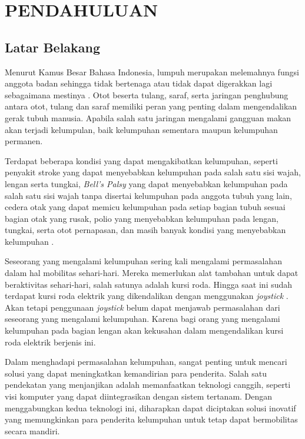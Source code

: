 \chapter{PENDAHULUAN}
\label{chap:pendahuluan}


\section{Latar Belakang}
\label{sec:latarbelakang}

Menurut Kamus Besar Bahasa Indonesia, lumpuh merupakan melemahnya fungsi anggota badan sehingga tidak bertenaga atau tidak dapat digerakkan lagi sebagaimana mestinya \parencite{Daring_2016}. Otot beserta tulang, saraf, serta jaringan penghubung antara otot, tulang dan saraf memiliki peran yang penting dalam mengendalikan gerak tubuh manusia. Apabila salah satu jaringan mengalami gangguan makan akan terjadi kelumpulan, baik kelumpuhan sementara maupun kelumpuhan permanen.

Terdapat beberapa kondisi yang dapat mengakibatkan kelumpuhan, seperti penyakit stroke yang dapat menyebabkan kelumpuhan pada salah satu sisi wajah, lengan serta tungkai, \emph{Bell's Palsy} yang dapat menyebabkan kelumpuhan pada salah satu sisi wajah tanpa disertai kelumpuhan pada anggota tubuh yang lain, cedera otak yang dapat memicu kelumpuhan pada setiap bagian tubuh sesuai bagian otak yang rusak, polio yang menyebabkan kelumpuhan pada lengan, tungkai, serta otot pernapasan, dan masih banyak kondisi yang menyebabkan kelumpuhan \parencite{Pansawira_2022}.

Seseorang yang mengalami kelumpuhan sering kali mengalami permasalahan dalam hal mobilitas sehari-hari. Mereka memerlukan alat tambahan untuk dapat beraktivitas sehari-hari, salah satunya adalah kursi roda. Hingga saat ini sudah terdapat kursi roda elektrik yang dikendalikan dengan menggunakan \emph{joystick} \parencite{choi2019motion}. Akan tetapi penggunaan \emph{joystick} belum dapat menjawab permasalahan dari seseorang yang mengalami kelumpuhan. Karena bagi orang yang mengalami kelumpuhan pada bagian lengan akan kekusahan dalam mengendalikan kursi roda elektrik berjenis ini.

Dalam menghadapi permasalahan kelumpuhan, sangat penting untuk mencari solusi yang dapat meningkatkan kemandirian para penderita. Salah satu pendekatan yang menjanjikan adalah memanfaatkan teknologi canggih, seperti visi komputer yang dapat diintegrasikan dengan sistem tertanam. Dengan menggabungkan kedua teknologi ini, diharapkan dapat diciptakan solusi inovatif yang memungkinkan para penderita kelumpuhan untuk tetap dapat bermobilitas secara mandiri.

